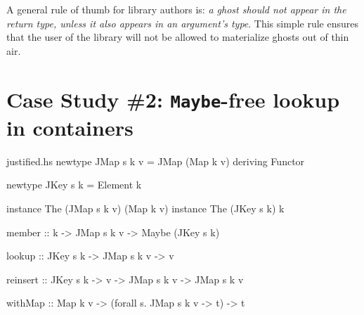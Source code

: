 \documentclass[format=sigplan, review=false, screen=true]{acmart}
\begin{document}
A general rule of thumb for library authors is:
\emph{a ghost should not appear in the return type,  unless it also appears in an argument's type}. This simple rule ensures that
the user of the library will not be allowed to materialize ghosts out of thin air.

\section{Case Study \#2: \texttt{Maybe}-free lookup in containers}

\begin{filecontents*}{justified.hs}
newtype JMap s k v = JMap (Map k v)
    deriving Functor

newtype JKey s k = Element k

instance The (JMap s k v) (Map k v)
instance The (JKey s k)  k

member ::  k -> JMap s k v -> Maybe (JKey s k)

lookup   :: JKey s k -> JMap s k v -> v

reinsert
  :: JKey s k -> v -> JMap s k v -> JMap s k v

withMap
:: Map k v  -> (forall s. JMap s k v -> t) -> t
\end{filecontents*}


\begin{figure*}
  \begin{minipage}{0.48\textwidth}
    \inputminted{haskell}{justified.hs}
  \end{minipage}
  \begin{minipage}{0.48\textwidth}
    \inputminted{haskell}{justified-usage.hs}
  \end{minipage}
\end{figure*}
\end{document}
